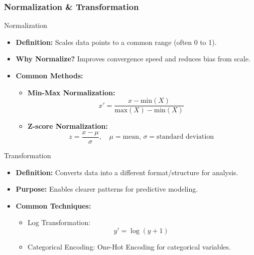 \documentclass{beamer}
\begin{document}
\begin{frame}[fragile]
    \frametitle{Normalization \& Transformation}
    \begin{block}{Normalization}
        \begin{itemize}
            \item \textbf{Definition:} Scales data points to a common range (often 0 to 1).
            \item \textbf{Why Normalize?} Improves convergence speed and reduces bias from scale.
            \item \textbf{Common Methods:}
            \begin{itemize}
                \item \textbf{Min-Max Normalization:}
                \begin{equation}
                x' = \frac{x - \text{min}(X)}{\text{max}(X) - \text{min}(X)}
                \end{equation}
                \item \textbf{Z-score Normalization:}
                \begin{equation}
                z = \frac{x - \mu}{\sigma}, \quad \mu = \text{mean}, \, \sigma = \text{standard deviation}
                \end{equation}
            \end{itemize}
        \end{itemize}
    \end{block}

    \begin{block}{Transformation}
        \begin{itemize}
            \item \textbf{Definition:} Converts data into a different format/structure for analysis.
            \item \textbf{Purpose:} Enables clearer patterns for predictive modeling.
            \item \textbf{Common Techniques:}
            \begin{itemize}
                \item Log Transformation:
                \begin{equation}
                y' = \log(y + 1)
                \end{equation}
                \item Categorical Encoding: One-Hot Encoding for categorical variables.
            \end{itemize}
        \end{itemize}
    \end{block}
\end{frame}
\end{document}
